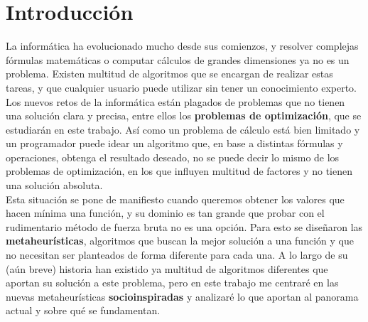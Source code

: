 \chapter{Introducción}

La informática ha evolucionado mucho desde sus comienzos, y resolver complejas fórmulas matemáticas o computar cálculos de grandes dimensiones ya no es un problema. Existen multitud de algoritmos que se encargan de realizar estas tareas, y que cualquier usuario puede utilizar sin tener un conocimiento experto. Los nuevos retos de la informática están plagados de problemas que no tienen una solución clara y precisa, entre ellos los \textbf{problemas de optimización}, que se estudiarán en este trabajo. Así como un problema de cálculo está bien limitado y un programador puede idear un algoritmo que, en base a distintas fórmulas y operaciones, obtenga el resultado deseado, no se puede decir lo mismo de los problemas de optimización, en los que influyen multitud de factores y no tienen una solución absoluta.\\

Esta situación se pone de manifiesto cuando queremos obtener los valores que hacen mínima una función, y su dominio es tan grande que probar con el rudimentario método de fuerza bruta no es una opción. Para esto se diseñaron las \textbf{metaheurísticas}, algoritmos que buscan la mejor solución a una función y que no necesitan ser planteados de forma diferente para cada una. A lo largo de su (aún breve) historia han existido ya multitud de algoritmos diferentes que aportan su solución a este problema, pero en este trabajo me centraré en las nuevas metaheurísticas \textbf{socioinspiradas} y analizaré lo que aportan al panorama actual y sobre qué se fundamentan.